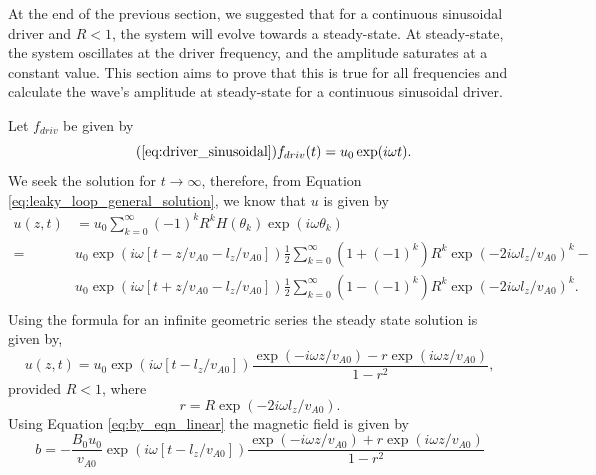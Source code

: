 At the end of the previous section, we suggested that for a continuous sinusoidal driver and $R<1$, the system will evolve towards a steady-state. At steady-state, the system oscillates at the driver frequency, and the amplitude saturates at a constant value. This section aims to prove that this is true for all frequencies and calculate the wave's amplitude at steady-state for a continuous sinusoidal driver.

Let $f_{driv}$ be given by
\begin{equation}
    \tag{\ref{eq:driver_sinusoidal}}
    f_{driv}(t)=u_0\exp(i\omega t).
\end{equation}
We seek the solution for $t \rightarrow\infty$, therefore, from Equation \eqref{eq:leaky_loop_general_solution}, we know that $u$ is given by
\[
    \begin{aligned}
    u(z,t) &= u_0\sum_{k=0}^\infty(-1)^kR^kH(\theta_k)\exp(i\omega\theta_k) \\
=&u_0\exp(i\omega[t-z/v_{A0}-l_z/v_{A0}])\frac{1}{2}\sum_{k=0}^{\infty}(1+(-1)^k)R^k\exp(-2i\omega l_z/v_{A0})^k-\\
&u_0\exp(i\omega[t+z/v_{A0}-l_z/v_{A0}])\frac{1}{2}\sum_{k=0}^{\infty}(1-(-1)^k)R^k\exp(-2i\omega l_z/v_{A0})^k. \\
    \end{aligned}
\]
Using the formula for an infinite geometric series the steady state solution is given by,
\begin{equation}
    \label{eq:leaky_steady_state_u}
    u(z,t) = u_0\exp(i\omega[t - l_z/v_{A0}])\frac{\exp(-i\omega z / v_{A0})-r\exp(i\omega z / v_{A0})}{1-r^2},
\end{equation}
provided $R<1$, where
\begin{equation}
    \label{eq:lower_case_r}
    r = R\exp(-2i\omega l_z / v_{A0}).
\end{equation}
Using Equation \eqref{eq:by_eqn_linear} the magnetic field is given by
\begin{equation}
    \label{eq:leaky_steady_state_b}
    b= -\frac{B_0u_0}{v_{A0}}\exp(i\omega[t - l_z/v_{A0}])\frac{\exp(-i\omega z / v_{A0})+r\exp(i\omega z / v_{A0})}{1-r^2}
\end{equation}

